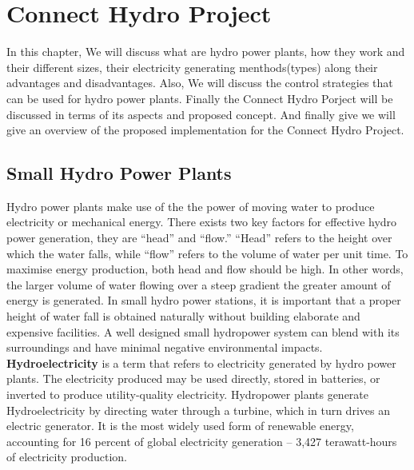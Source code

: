 \chapter{Connect Hydro Project}
\label{ChapterThree}
In this chapter, We will discuss what are hydro power plants, how they work and their different sizes, their electricity generating menthods(types) along their advantages and disadvantages. Also, We will discuss the control strategies that can be used for hydro power plants. Finally the Connect Hydro Porject will be discussed in terms of its aspects and proposed concept. And finally give  we will give an overview of the proposed implementation for the Connect Hydro Project.
\section{Small Hydro Power Plants}
\label{SmallHydroPowerPlants}
Hydro power plants make use of the the power of moving water to produce electricity or mechanical energy. There exists two key factors for effective hydro power generation, they are “head” and “flow.” “Head” refers to the height over which the water falls, while “flow” refers to the volume of water per unit time.\cite{SmallScale} To maximise energy production, both head and flow should be high. In other words, the larger volume of water flowing over a steep gradient the greater amount of energy is generated. In small hydro power stations, it is important that a proper height of water fall is obtained naturally without building elaborate and expensive facilities.\cite{SmallScale,HydroPower} A well designed small hydropower system can blend with its surroundings and have minimal negative environmental impacts.\cite{SmallScale,HydroPower}\\

\textbf{Hydroelectricity} is a term that refers to electricity generated by hydro power plants. The electricity produced may be used directly, stored in batteries, or inverted to produce utility-quality electricity. Hydropower plants generate Hydroelectricity by directing water through a turbine, which in turn drives an electric generator. It is the most widely used form of renewable energy, accounting for 16 percent of global electricity generation – 3,427 terawatt-hours of electricity production.\cite{HydroPower}

